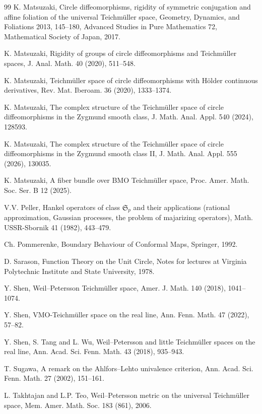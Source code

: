 \documentclass[amstex,12pt,reqno]{amsart}
\theoremstyle{definition}
\begin{document}
\begin{thebibliography}{99}
K. Matsuzaki, 
Circle diffeomorphisms, rigidity of symmetric conjugation and affine foliation of the universal Teichm\"uller space,
Geometry, Dynamics, and Foliations 2013, 145--180, Advanced Studies in Pure Mathematics 72, 
Mathematical Society of Japan, 2017.

 K. Matsuzaki, Rigidity of groups of circle diffeomorphisms and Teich\-m\"ul\-ler spaces, 
J. Anal. Math. 40 (2020), 511--548.

 K. Matsuzaki, Teich\-m\"ul\-ler space of circle diffeomorphisms with H\"older continuous derivatives, 
Rev. Mat. Iberoam. 36 (2020), 1333--1374.

 K. Matsuzaki, The complex structure of the Teich\-m\"ul\-ler space of circle diffeomorphisms 
in the Zygmund smooth class, J. Math. Anal. Appl. 540 (2024), 128593.

 K. Matsuzaki, The complex structure of the Teich\-m\"ul\-ler space of circle diffeomorphisms 
in the Zygmund smooth class II, J. Math. Anal. Appl. 555 (2026), 130035.

 K. Matsuzaki, A fiber bundle over BMO Teich\-m\"ul\-ler space, Proc. Amer. Math. Soc. Ser. B 12 (2025).

 V.V. Peller, Hankel operators of class $\mathfrak{S}_p$ and their applications (rational approximation, 
Gaussian processes, the problem of majarizing operators), Math. USSR-Sbornik 41 (1982), 443--479.

 Ch. Pommerenke, Boundary Behaviour of Conformal Maps, Springer, 1992.

 D. Sarason, Function Theory on the Unit Circle, 
Notes for lectures at Virginia Polytechnic Institute and State University, 1978.

 Y. Shen, Weil--Petersson Teich\-m\"ul\-ler space, 
Amer. J. Math. 140 (2018), 1041--1074. 

 Y. Shen, VMO-Teich\-m\"ul\-ler space on the real line, 
Ann. Fenn. Math. 47 (2022), 57--82. 

 Y. Shen, S. Tang and L. Wu, Weil--Petersson and little Teich\-m\"ul\-ler spaces on the real line, 
Ann. Acad. Sci. Fenn. Math. 43 (2018), 935--943. 

 T. Sugawa, A remark on the Ahlfors--Lehto univalence criterion,
Ann. Acad. Sci. Fenn. Math. 27 (2002), 151--161.

 L. Takhtajan and L.P. Teo, Weil--Petersson metric on the universal Teich\-m\"ul\-ler space, 
Mem. Amer. Math. Soc. 183 (861), 2006.


\end{thebibliography}
\end{document}
